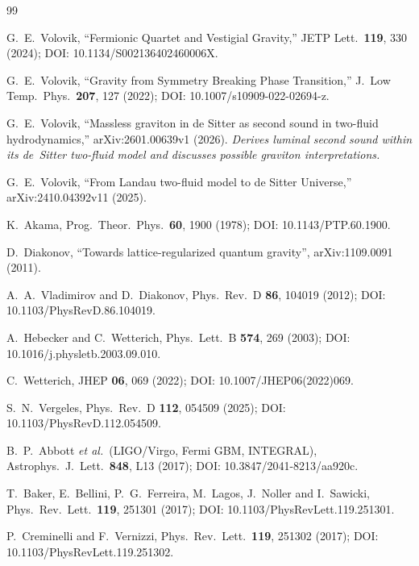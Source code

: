 \documentclass[aps,prl,reprint,nofootinbib,superscriptaddress]{revtex4-2}
\begin{document}
\begin{thebibliography}{99}

G.~E.~Volovik, ``Fermionic Quartet and Vestigial Gravity,''
JETP Lett.\ \textbf{119}, 330 (2024);
DOI: 10.1134/S002136402460006X.

G.~E.~Volovik, ``Gravity from Symmetry Breaking Phase Transition,''
J.~Low Temp.\ Phys.\ \textbf{207}, 127 (2022);
DOI: 10.1007/s10909-022-02694-z.

G.~E.~Volovik, ``Massless graviton in de Sitter as second sound in
two-fluid hydrodynamics,'' arXiv:2601.00639v1 (2026).
\emph{Derives luminal second sound within its de~Sitter two-fluid
model and discusses possible graviton interpretations.}

G.~E.~Volovik, ``From Landau two-fluid model to de Sitter Universe,''
arXiv:2410.04392v11 (2025).

K.~Akama, Prog.\ Theor.\ Phys.\ \textbf{60}, 1900 (1978);
DOI: 10.1143/PTP.60.1900.

D.~Diakonov, ``Towards lattice-regularized quantum gravity'',
arXiv:1109.0091 (2011).

A.~A.~Vladimirov and D.~Diakonov,
Phys.\ Rev.\ D \textbf{86}, 104019 (2012);
DOI: 10.1103/PhysRevD.86.104019.

A.~Hebecker and C.~Wetterich,
Phys.\ Lett.\ B \textbf{574}, 269 (2003);
DOI: 10.1016/j.physletb.2003.09.010.

C.~Wetterich, JHEP \textbf{06}, 069 (2022);
DOI: 10.1007/JHEP06(2022)069.

S.~N.~Vergeles, Phys.\ Rev.\ D \textbf{112}, 054509 (2025);
DOI: 10.1103/PhysRevD.112.054509.

B.~P.~Abbott \emph{et al.}\ (LIGO/Virgo, Fermi GBM, INTEGRAL),
Astrophys.\ J.\ Lett.\ \textbf{848}, L13 (2017);
DOI: 10.3847/2041-8213/aa920c.

T.~Baker, E.~Bellini, P.~G.~Ferreira, M.~Lagos, J.~Noller and I.~Sawicki,
Phys.\ Rev.\ Lett.\ \textbf{119}, 251301 (2017);
DOI: 10.1103/PhysRevLett.119.251301.

P.~Creminelli and F.~Vernizzi,
Phys.\ Rev.\ Lett.\ \textbf{119}, 251302 (2017);
DOI: 10.1103/PhysRevLett.119.251302.


\end{thebibliography}
\end{document}
